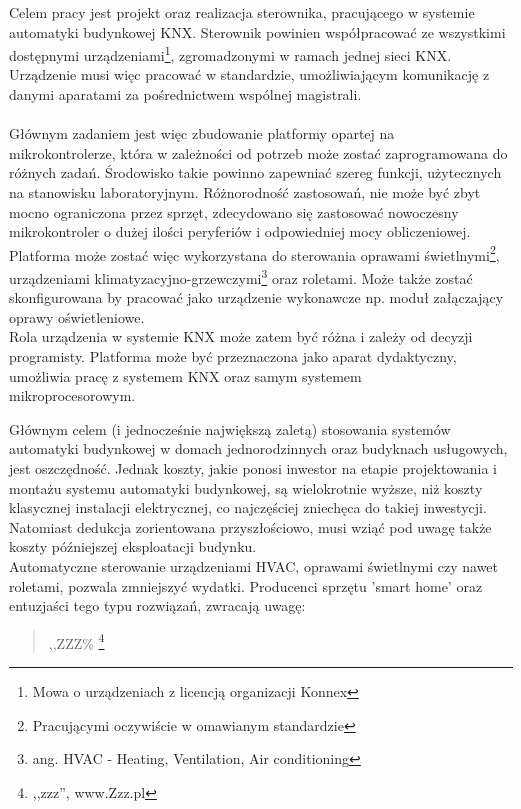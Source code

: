 \documentclass[a4paper, 11pt]{report}
\newcommand{\ods}{\hspace*{1em}}
\begin{document}
Celem pracy jest projekt oraz realizacja sterownika, pracującego w systemie automatyki budynkowej KNX. Sterownik powinien współpracować ze wszystkimi dostępnymi urządzeniami\footnote{Mowa o urządzeniach z licencją organizacji Konnex}, zgromadzonymi w ramach jednej sieci KNX. Urządzenie musi więc pracować w standardzie, umożliwiającym komunikację z danymi aparatami za pośrednictwem wspólnej magistrali.
\\ \\
Głównym zadaniem jest więc zbudowanie platformy opartej na \\mikrokontrolerze, która w zależności od potrzeb może zostać zaprogramowana do różnych zadań. Środowisko takie powinno zapewniać szereg funkcji, użytecznych na stanowisku laboratoryjnym. Różnorodność zastosowań, nie może być zbyt mocno ograniczona przez sprzęt, zdecydowano się zastosować nowoczesny mikrokontroler o dużej ilości peryferiów i odpowiedniej mocy obliczeniowej. Platforma może zostać więc wykorzystana do sterowania oprawami świetlnymi\footnote{Pracującymi oczywiście w omawianym standardzie}, urządzeniami klimatyzacyjno-grzewczymi\footnote{ang. HVAC - Heating, Ventilation, Air conditioning} oraz roletami. Może także zostać skonfigurowana by pracować jako urządzenie wykonawcze np. moduł załączający oprawy oświetleniowe. \\Rola urządzenia w systemie KNX może zatem być różna i zależy od decyzji programisty.
Platforma może być przeznaczona jako aparat dydaktyczny, umożliwia pracę z systemem KNX oraz samym systemem\\ mikroprocesorowym.


\newpage
\ods Głównym celem (i jednocześnie największą zaletą) stosowania systemów automatyki budynkowej w domach jednorodzinnych oraz budyknach usługowych, jest oszczędność. Jednak koszty, jakie ponosi inwestor na etapie projektowania i montażu systemu automatyki budynkowej, są wielokrotnie wyższe, niż koszty klasycznej instalacji elektrycznej, co najczęściej zniechęca do takiej inwestycji. Natomiast dedukcja zorientowana przyszłościowo, musi wziąć pod uwagę także koszty późniejszej eksploatacji budynku. \\Automatyczne sterowanie urządzeniami HVAC, oprawami świetlnymi czy nawet roletami, pozwala zmniejszyć wydatki. Producenci sprzętu 'smart home' oraz entuzjaści tego typu rozwiązań, zwracają uwagę: \\
\begin{quote}
	,,ZZZ\% \footnote{,,zzz'', www.Zzz.pl}
\end{quote}
\end{document}
